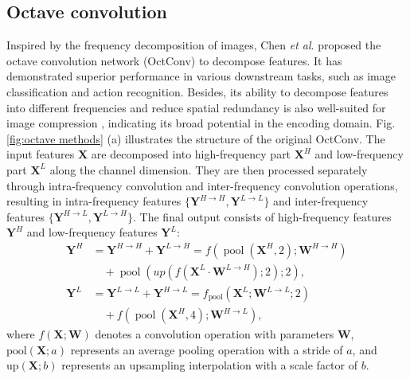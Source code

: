 \subsection{Octave convolution}
Inspired by the frequency decomposition of images, Chen \textit{et al}. \cite{chen2019drop} proposed the octave convolution network (OctConv) to decompose features. It has demonstrated superior performance in various downstream tasks, such as image classification and action recognition. Besides, its ability to decompose features into different frequencies and reduce spatial redundancy is also well-suited for image compression \cite{jiang2024OMR}, indicating its broad potential in the encoding domain. Fig. \ref{fig:octave methods} (a) illustrates the structure of the original OctConv. The input features \(\bm{X}\) are decomposed into high-frequency part \(\bm{X}^H\) and low-frequency part \(\bm{X}^L\) along the channel dimension. They are then processed separately through intra-frequency convolution and inter-frequency convolution operations, resulting in intra-frequency features \(\{ \bm{Y}^{H \rightarrow H}, \bm{Y}^{L \rightarrow L} \}\) and inter-frequency features \(\{ \bm{Y}^{H \rightarrow L}, \bm{Y}^{L \rightarrow H} \}\). The final output consists of high-frequency features \(\bm{Y}^H\) and low-frequency features \(\bm{Y}^L\):
\begin{align}
\bm{Y}^H &= \bm{Y}^{H \rightarrow H} + \bm{Y}^{L \rightarrow H} = f\left(\operatorname{pool}\left(\bm{X}^H, 2\right); \bm{W}^{H \rightarrow H}\right) \nonumber \\
& \quad + \operatorname{pool}\left(up\left(f\left(\bm{X}^L \cdot \bm{W}^{L \rightarrow H}\right); 2\right); 2\right), \\
\bm{Y}^L &= \bm{Y}^{L \rightarrow L} + \bm{Y}^{H \rightarrow L} = f_{\text{pool}}\left(\bm{X}^L; \bm{W}^{L \rightarrow L}; 2\right) \nonumber \\
& \quad + f\left(\operatorname{pool}\left(\bm{X}^H, 4\right); \bm{W}^{H \rightarrow L}\right) ,
\end{align}
where \( f(\bm{X}; \bm{W}) \) denotes a convolution operation with parameters \(\bm{W} \), \( \text{pool}(\bm{X}; a) \) represents an average pooling operation with a stride of \( a \), and \( \text{up}(\bm{X}; b) \) represents an upsampling interpolation with a scale factor of \( b \).

